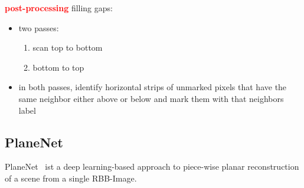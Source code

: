 \documentclass[main.tex]{subfiles}
\begin{document}
\textbf{\textcolor{red}{post-processing}}
filling gaps:
\begin{itemize}
    \item two passes:
          \begin{enumerate}
              \item scan top to bottom
              \item bottom to top
          \end{enumerate}
    \item in both passes, identify horizontal strips of unmarked pixels that have the same neighbor either above or
          below and mark them with that neighbors label
\end{itemize}

\subsection{PlaneNet}
PlaneNet~\cite{Liu_Yang_Ceylan_Yumer_Furukawa_2018} ist a deep learning-based approach to piece-wise planar reconstruction of a scene from a single RBB-Image.
\end{document}
